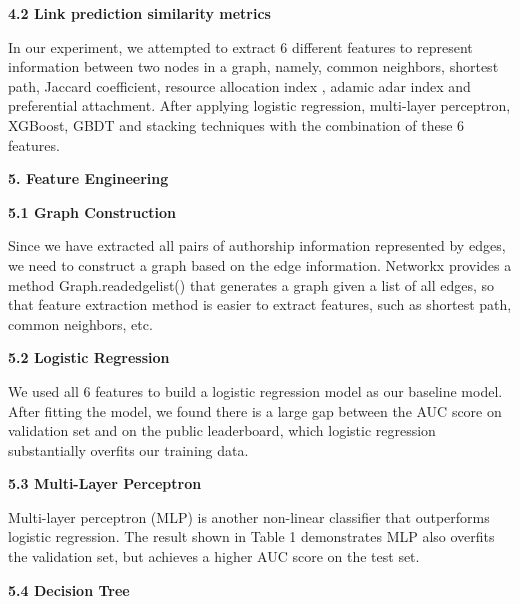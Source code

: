 \documentclass[12pt]{article}
\renewcommand{\_}{\kern-1.5pt\textunderscore\kern-1.5pt}
\begin{document}
\begin{justify}
\textbf{4.2 Link prediction similarity metrics }
\end{justify}
\begin{justify}
In our experiment, we attempted to extract 6 different features to represent information between two nodes in a graph, namely, common neighbors, shortest path, Jaccard coefficient, resource allocation index , adamic adar index and preferential attachment. After applying logistic regression, multi-layer perceptron, XGBoost, GBDT and stacking techniques with the combination of these 6 features.
\end{justify}
\setlength{\parskip}{6.0pt}
\begin{justify}
{\fontsize{13pt}{15.6pt}\selectfont \textbf{5. Feature Engineering}}
\end{justify}
\setlength{\parskip}{3.0pt}
\begin{justify}
\textbf{5.1 Graph Construction}
\end{justify}
\begin{justify}
Since we have extracted all pairs of authorship information represented by edges, we need to construct a graph based on the edge information. Networkx provides a method {\fontsize{9pt}{10.8pt}\selectfont Graph.read\_edgelist() }that generates a graph given a list of all edges, so that feature extraction method is easier to extract features, such as shortest path, common neighbors, etc.
\end{justify}
\begin{justify}
\textbf{5.2 Logistic Regression}
\end{justify}
\begin{justify}
We used all 6 features to build a logistic regression model as our baseline model. After fitting the model, we found there is a large gap between the AUC score on validation set and on the public leaderboard, which logistic regression substantially overfits our training data.
\end{justify}
\begin{justify}
\textbf{5.3 Multi-Layer Perceptron}
\end{justify}
\begin{justify}
Multi-layer perceptron (MLP) is another non-linear classifier that outperforms logistic regression. The result shown in Table 1 demonstrates MLP also overfits the validation set, but achieves a higher AUC score on the test set.
\end{justify}
\begin{justify}
\textbf{5.4 Decision Tree}
\end{justify}
\end{document}
